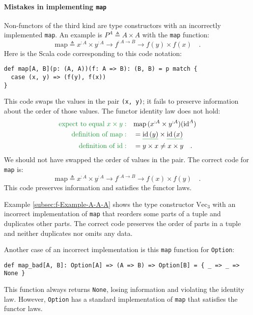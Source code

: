 \paragraph{Mistakes in implementing \texttt{map}}

Non-functors of the third kind are type constructors with an incorrectly
implemented \lstinline!map!. An example is  $P^{A}\triangleq A\times A$
with the \lstinline!map! function:
\[
\text{map}\triangleq x^{:A}\times y^{:A}\rightarrow f^{:A\rightarrow B}\rightarrow f(y)\times f(x)\quad.
\]
Here is the Scala code corresponding to this code notation:
\begin{lstlisting}
def map[A, B](p: (A, A))(f: A => B): (B, B) = p match {
  case (x, y) => (f(y), f(x))
}
\end{lstlisting}
This code swaps the values in the pair \lstinline!(x, y)!; it fails
to preserve information about the order of those values. The functor
identity law does not hold:
\begin{align*}
{\color{greenunder}\text{expect to equal }x\times y:}\quad & \text{map}\,(x^{:A}\times y^{:A})(\text{id}^{A})\\
{\color{greenunder}\text{definition of }\text{map}:}\quad & =\gunderline{\text{id}\,(y)}\times\gunderline{\text{id}\,(x)}\\
{\color{greenunder}\text{definition of }\text{id}:}\quad & =y\times x\neq x\times y\quad.
\end{align*}
We should not have swapped the order of values in the pair. The correct
code for \lstinline!map! is:
\[
\text{map}\triangleq x^{:A}\times y^{:A}\rightarrow f^{:A\rightarrow B}\rightarrow f(x)\times f(y)\quad.
\]
This code preserves information and satisfies the functor laws.

Example \ref{subsec:f-Example-A-A-A} shows the type constructor $\text{Vec}_{3}$
with an incorrect implementation of \lstinline!map! that reorders
some parts of a tuple and duplicates other parts. The correct code
preserves the order of parts in a tuple and neither duplicates nor
omits any data.

Another case of an incorrect implementation is this \lstinline!map!
function for \lstinline!Option!:
\begin{lstlisting}
def map_bad[A, B]: Option[A] => (A => B) => Option[B] = { _ => _ => None }
\end{lstlisting}
This function always returns \lstinline!None!, losing information
and violating the identity law. However, \lstinline!Option! has a
standard implementation of \lstinline!map! that satisfies the functor
laws.

